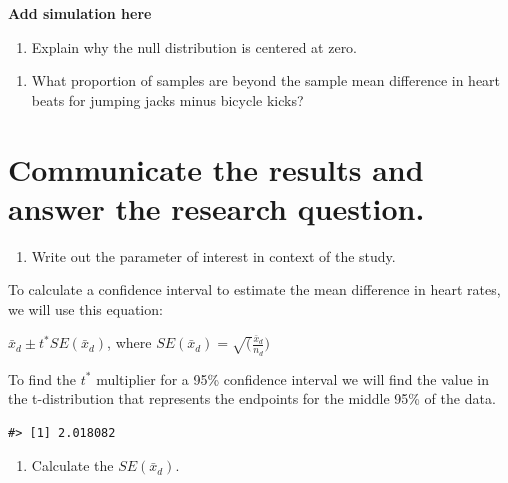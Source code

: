 \documentclass[
]{report}
\providecommand{\tightlist}{%
  \setlength{\itemsep}{0pt}\setlength{\parskip}{0pt}}
\begin{document}
\vspace{1in}

\textbf{Add simulation here}

\begin{enumerate}
\def\labelenumi{\arabic{enumi}.}
\setcounter{enumi}{11}
\tightlist
\item
  Explain why the null distribution is centered at zero.
\end{enumerate}

\vspace{1in}

\begin{enumerate}
\def\labelenumi{\arabic{enumi}.}
\setcounter{enumi}{12}
\tightlist
\item
  What proportion of samples are beyond the sample mean difference in heart beats for jumping jacks minus bicycle kicks?
\end{enumerate}

\vspace{1in}

\hypertarget{communicate-the-results-and-answer-the-research-question.}{%
\section{Communicate the results and answer the research question.}\label{communicate-the-results-and-answer-the-research-question.}}

\begin{enumerate}
\def\labelenumi{\arabic{enumi}.}
\setcounter{enumi}{13}
\tightlist
\item
  Write out the parameter of interest in context of the study.
\end{enumerate}

\vspace{1in}

To calculate a confidence interval to estimate the mean difference in heart rates, we will use this equation:

\(\bar{x}_d \pm t^*SE(\bar{x}_d)\), where \(SE(\bar{x}_d) = \sqrt(\frac{\bar{x}_d}{n_d})\)

To find the \(t^*\) multiplier for a 95\% confidence interval we will find the value in the t-distribution that represents the endpoints for the middle 95\% of the data.

\begin{verbatim}
#> [1] 2.018082
\end{verbatim}

\begin{enumerate}
\def\labelenumi{\arabic{enumi}.}
\setcounter{enumi}{14}
\tightlist
\item
  Calculate the \(SE(\bar{x}_d)\).
\end{enumerate}
\end{document}
